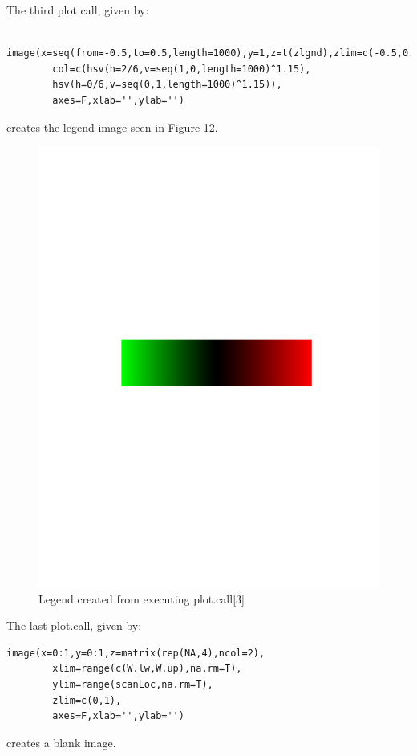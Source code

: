 \documentclass[]{article}
\begin{document}
\indent The third plot call, given by:
\begin{verbatim}
  image(x=seq(from=-0.5,to=0.5,length=1000),y=1,z=t(zlgnd),zlim=c(-0.5,0.5),
        col=c(hsv(h=2/6,v=seq(1,0,length=1000)^1.15),
        hsv(h=0/6,v=seq(0,1,length=1000)^1.15)),
        axes=F,xlab='',ylab='')
\end{verbatim}
creates the legend image seen in Figure 12. 
\begin{center}
\begin{figure}
\includegraphics{legend}
\caption{Legend created from executing plot.call[3]}
\end{figure}
\end{center}

\indent The last plot.call, given by: 
\begin{verbatim}
image(x=0:1,y=0:1,z=matrix(rep(NA,4),ncol=2),
        xlim=range(c(W.lw,W.up),na.rm=T),
        ylim=range(scanLoc,na.rm=T),
        zlim=c(0,1),
        axes=F,xlab='',ylab='')
\end{verbatim}
creates a blank image. 
\end{document}
